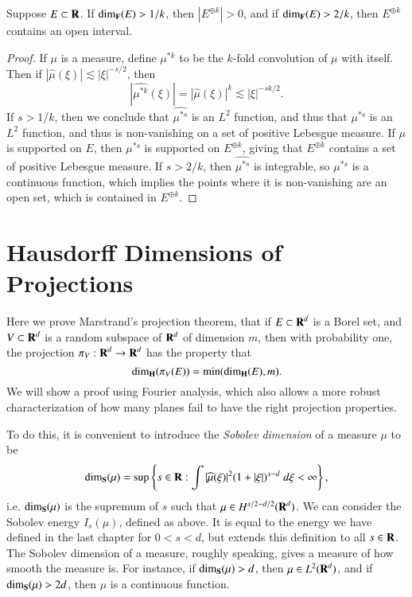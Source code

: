\begin{theorem}
  Suppose $E \subset \operatorname{\mathbf{R}}$. If $\operatorname{\dim_{\mathbf{F}}}(E) > 1/k$, then $|E^{\oplus k}| > 0$, and if $\operatorname{\dim_{\mathbf{F}}}(E) > 2/k$, then $E^{\oplus k}$ contains an open interval.
\end{theorem}
\begin{proof}
  If $\mu$ is a measure, define $\mu^{* k}$ to be the $k$-fold convolution of $\mu$ with itself. Then if $|\widehat{\mu}(\xi)| \lesssim |\xi|^{-s/2}$, then
  \[ |\widehat{\mu^{* k}}(\xi)| = |\widehat{\mu}(\xi)|^k \lesssim |\xi|^{-sk/2}. \]
  If $s > 1/k$, then we conclude that $\widehat{\mu^{* s}}$ is an $L^2$ function, and thus that $\mu^{* s}$ is an $L^2$ function, and thus is non-vanishing on a set of positive Lebesgue measure. If $\mu$ is supported on $E$, then $\mu^{* s}$ is supported on $E^{\oplus k}$, giving that $E^{\oplus k}$ contains a set of positive Lebesgue measure. If $s > 2/k$, then $\widehat{\mu^{* s}}$ is integrable, so $\mu^{* s}$ is a continuous function, which implies the points where it is non-vanishing are an open set, which is contained in $E^{\oplus k}$.
\end{proof}






\chapter{Hausdorff Dimensions of Projections}

Here we prove Marstrand's projection theorem, that if $E \subset \operatorname{\mathbf{R}}^d$ is a Borel set, and $V \subset \operatorname{\mathbf{R}}^d$ is a random subspace of $\operatorname{\mathbf{R}}^d$ of dimension $m$, then with probability one, the projection $\pi_V: \operatorname{\mathbf{R}}^d \to \operatorname{\mathbf{R}}^d$ has the property that
%
\[ \operatorname{\dim_{\mathbf{H}}}(\pi_V(E)) = \min(\operatorname{\dim_{\mathbf{H}}}(E), m). \]
%
We will show a proof using Fourier analysis, which also allows a more robust characterization of how many planes fail to have the right projection properties.

To do this, it is convenient to introduce the \emph{Sobolev dimension} of a measure $\mu$ to be
%
\[ \operatorname{\dim_{\mathbf{S}}}(\mu) = \sup \left\{ s \in \operatorname{\mathbf{R}}: \int |\widehat{\mu}(\xi)|^2 (1 + |\xi|)^{s-d}\; d\xi < \infty \right\}, \]
%
i.e. $\operatorname{\dim_{\mathbf{S}}}(\mu)$ is the supremum of $s$ such that $\mu \in H^{s/2 - d/2}(\operatorname{\mathbf{R}}^d)$. We can consider the Sobolev energy $I_s(\mu)$, defined as above. It is equal to the energy we have defined in the last chapter for $0 < s < d$, but extends this definition to all $s \in \operatorname{\mathbf{R}}$. The Sobolev dimension of a measure, roughly speaking, gives a measure of how smooth the measure is. For instance, if $\operatorname{\dim_{\mathbf{S}}}(\mu) > d$, then $\mu \in L^2(\operatorname{\mathbf{R}}^d)$, and if $\operatorname{\dim_{\mathbf{S}}}(\mu) > 2d$, then $\mu$ is a continuous function.

